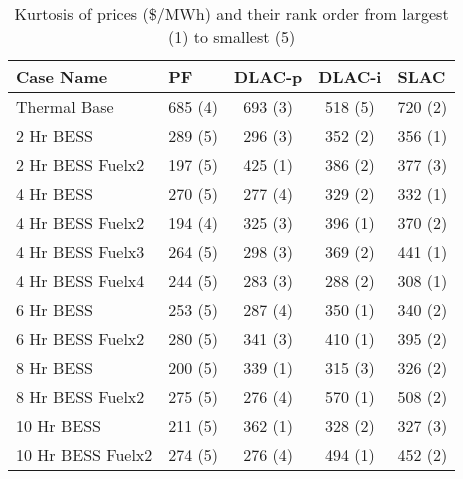 \begin{table}[htp]
\centering
\caption{Kurtosis of prices (\$/MWh) and their rank order from largest (1) to smallest (5)}
\begin{tabular}{lcccc}
\hline
\textbf{Case Name} & \multicolumn{1}{l}{\textbf{PF}} 
& \multicolumn{1}{l}{\textbf{DLAC-p}} 
& \multicolumn{1}{l}{\textbf{DLAC-i}} 
& \multicolumn{1}{l}{\textbf{SLAC}} 
\\
\hline
Thermal Base & 685 (4) & 693 (3) & 518 (5) & 720 (2) \\
2 Hr BESS & 289 (5) & 296 (3) & 352 (2) & 356 (1) \\
2 Hr BESS Fuelx2 & 197 (5) & 425 (1) & 386 (2) & 377 (3) \\
4 Hr BESS & 270 (5) & 277 (4) & 329 (2) & 332 (1) \\
4 Hr BESS Fuelx2 & 194 (4) & 325 (3) & 396 (1) & 370 (2) \\
4 Hr BESS Fuelx3 & 264 (5) & 298 (3) & 369 (2) & 441 (1) \\
4 Hr BESS Fuelx4 & 244 (5) & 283 (3) & 288 (2) & 308 (1) \\
6 Hr BESS & 253 (5) & 287 (4) & 350 (1) & 340 (2) \\
6 Hr BESS Fuelx2 & 280 (5) & 341 (3) & 410 (1) & 395 (2) \\
8 Hr BESS & 200 (5) & 339 (1) & 315 (3) & 326 (2) \\
8 Hr BESS Fuelx2 & 275 (5) & 276 (4) & 570 (1) & 508 (2) \\
10 Hr BESS & 211 (5) & 362 (1) & 328 (2) & 327 (3) \\
10 Hr BESS Fuelx2 & 274 (5) & 276 (4) & 494 (1) & 452 (2) \\
\hline
\end{tabular}
\label{tab:std_with_ranks}
\end{table}
